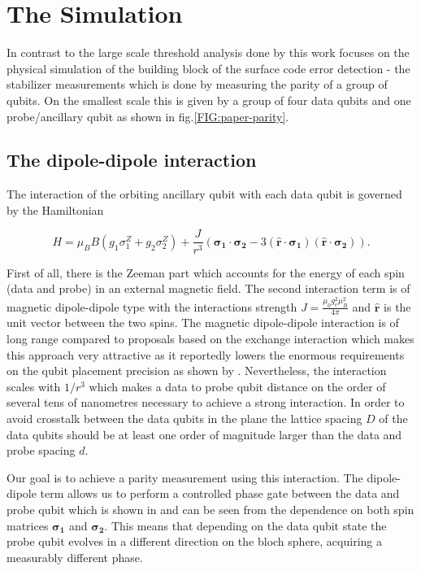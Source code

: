 \section{The Simulation}
In contrast to the large scale threshold analysis done by \citet{OGorman2016} this work focuses on the physical simulation of the building block of the surface code error detection - the stabilizer measurements which is done by measuring the parity of a group of qubits. On the smallest scale this is given by a group of four data qubits and one probe/ancillary qubit as shown in fig.\@ \ref{FIG:paper-parity}. 

\subsection{The dipole-dipole interaction}\label{sec:dipole-dipole}

The interaction of the orbiting ancillary qubit with each data qubit is governed by the Hamiltonian

\begin{equation*}
H = \mu_B B( g_1 \sigma_1^Z + g_2 \sigma_2^Z) + \frac{J}{r^3} ( \mathbf{\sigma_1} \cdot \mathbf{\sigma_2} - 3 ( \hat{\mathbf{r}} \cdot \mathbf{\sigma_1}) ( \hat{\mathbf{r}}\cdot \mathbf{\sigma_2})).
\end{equation*}

First of all, there is the Zeeman part which accounts for the energy of each spin (data and probe) in an external magnetic field. The second interaction term is of magnetic dipole-dipole type with the interactions strength $J=\frac{\mu_0 g_e^2 \mu_B^2}{4\pi}$ and $\hat{\mathbf{r}}$ is the unit vector between the two spins. The magnetic dipole-dipole interaction is of long range compared to proposals based on the exchange interaction \cite{Kane1998a} which makes this approach very attractive as it reportedly lowers the enormous requirements on the qubit placement precision as shown by \citet{OGorman2016}. Nevertheless, the interaction scales with $1/r^3$ which makes a data to probe qubit distance on the order of several tens of nanometres necessary to achieve a strong interaction. In order to avoid crosstalk between the data qubits in the plane the lattice spacing $D$ of the data qubits should be at least one order of magnitude larger than the data and probe spacing $d$. 

Our goal is to achieve a parity measurement using this interaction. The dipole-dipole term allows us to perform a controlled phase gate between the data and probe qubit which is shown in \cite{OGorman2016} and can be seen from the dependence on both spin matrices $\mathbf{\sigma_1}$ and $\mathbf{\sigma_2}$. This means that depending on the data qubit state the probe qubit evolves in a different direction on the bloch sphere, acquiring a measurably different phase. 

